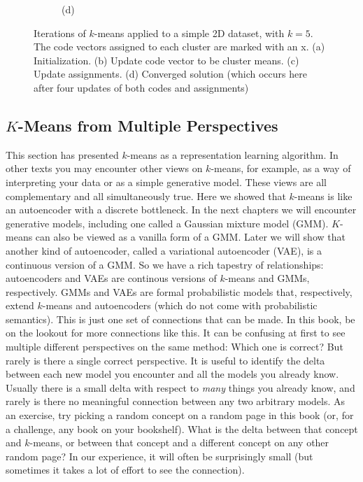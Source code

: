 \begin{figure}[t]
{\begin{subfigure}{0.25\textwidth}
            \caption*{(d)}
        \end{subfigure}%
    }
    \caption{Iterations of $k$-means applied to a simple 2D dataset, with $k=5$. The code vectors assigned to each cluster are marked with an x. (a) Initialization. (b) Update code vector to be cluster means. (c) Update assignments. (d) Converged solution (which occurs here after four updates of both codes and assignments)}
    \label{fig:representation_learning:kmeans_ex}
\end{figure}

\subsection{$K$-Means from Multiple Perspectives}
This section has presented $k$-means as a representation learning algorithm. In other texts you may encounter other views on $k$-means, for example, as a way of interpreting your data or as a simple generative model. These views are all complementary and all simultaneously true. Here we showed that $k$-means is like an autoencoder with a discrete bottleneck. In the next chapters we will encounter generative models, including one called a Gaussian mixture model (GMM). $K$-means can also be viewed as a vanilla form of a GMM. Later we will show that another kind of autoencoder, called a variational autoencoder (VAE), is a continuous version of a GMM. So we have a rich tapestry of relationships: autoencoders and VAEs are continous versions of $k$-means and GMMs, respectively. GMMs and VAEs are formal probabilistic models that, respectively, extend $k$-means and autoencoders (which do not come with probabilistic semantics). This is just one set of connections that can be made. In this book, be on the lookout for more connections like this. It can be confusing at first to see multiple different perspectives on the same method: Which one is correct? But rarely is there a single correct perspective. It is useful to identify the delta between each new model you encounter and all the models you already know. Usually there is a small delta with respect to \textit{many} things you already know, and rarely is there no meaningful connection between any two arbitrary models. As an exercise, try picking a random concept on a random page in this book (or, for a challenge, any book on your bookshelf). What is the delta between that concept and $k$-means, or between that concept and a different concept on any other random page? In our experience, it will often be surprisingly small (but sometimes it takes a lot of effort to see the connection).

